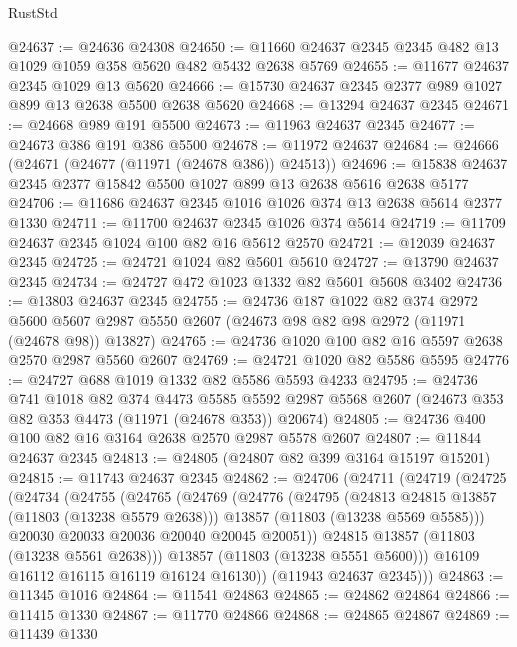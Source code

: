 \begin{lexlean}{RustStd}
\begin{coremodule}
@24637 := @24636 @24308
@24650 := @11660 @24637 @2345 @2345 @482 @13 @1029 @1059 @358 @5620 @482 @5432 @2638 @5769
@24655 := @11677 @24637 @2345 @1029 @13 @5620
@24666 := @15730 @24637 @2345 @2377 @989 @1027 @899 @13 @2638 @5500 @2638 @5620
@24668 := @13294 @24637 @2345
@24671 := @24668 @989 @191 @5500
@24673 := @11963 @24637 @2345
@24677 := @24673 @386 @191 @386 @5500
@24678 := @11972 @24637
@24684 := @24666 (@24671 (@24677 (@11971 (@24678 @386)) @24513))
@24696 := @15838 @24637 @2345 @2377 @15842 @5500 @1027 @899 @13 @2638 @5616 @2638 @5177
@24706 := @11686 @24637 @2345 @1016 @1026 @374 @13 @2638 @5614 @2377 @1330
@24711 := @11700 @24637 @2345 @1026 @374 @5614
@24719 := @11709 @24637 @2345 @1024 @100 @82 @16 @5612 @2570
@24721 := @12039 @24637 @2345
@24725 := @24721 @1024 @82 @5601 @5610
@24727 := @13790 @24637 @2345
@24734 := @24727 @472 @1023 @1332 @82 @5601 @5608 @3402
@24736 := @13803 @24637 @2345
@24755 := @24736
    @187
    @1022
    @82
    @374
    @2972
    @5600
    @5607
    @2987
    @5550
    @2607
    (@24673 @98 @82 @98 @2972 (@11971 (@24678 @98)) @13827)
@24765 := @24736 @1020 @100 @82 @16 @5597 @2638 @2570 @2987 @5560 @2607
@24769 := @24721 @1020 @82 @5586 @5595
@24776 := @24727 @688 @1019 @1332 @82 @5586 @5593 @4233
@24795 := @24736
    @741
    @1018
    @82
    @374
    @4473
    @5585
    @5592
    @2987
    @5568
    @2607
    (@24673 @353 @82 @353 @4473 (@11971 (@24678 @353)) @20674)
@24805 := @24736 @400 @100 @82 @16 @3164 @2638 @2570 @2987 @5578 @2607
@24807 := @11844 @24637 @2345
@24813 := @24805 (@24807 @82 @399 @3164 @15197 @15201)
@24815 := @11743 @24637 @2345
@24862 := @24706
    (@24711
      (@24719
        (@24725
          (@24734
            (@24755
              (@24765
                (@24769
                  (@24776
                    (@24795
                      (@24813 @24815 @13857 (@11803 (@13238 @5579 @2638)))
                      @13857
                      (@11803 (@13238 @5569 @5585)))
                    @20030
                    @20033
                    @20036
                    @20040
                    @20045
                    @20051))
                @24815
                @13857
                (@11803 (@13238 @5561 @2638)))
              @13857
              (@11803 (@13238 @5551 @5600)))
            @16109
            @16112
            @16115
            @16119
            @16124
            @16130))
        (@11943 @24637 @2345)))
@24863 := @11345 @1016
@24864 := @11541 @24863
@24865 := @24862 @24864
@24866 := @11415 @1330
@24867 := @11770 @24866
@24868 := @24865 @24867
@24869 := @11439 @1330

\end{coremodule}
\end{lexlean}
